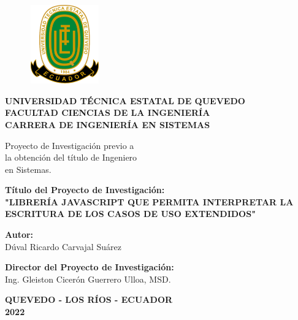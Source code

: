 \begin{center}
		\begin{figure}[htb]
		\begin{center}
			\includegraphics[width=3.04cm,height=3.39cm]{img/logoUTEQ.png}
		\end{center}
	\end{figure}
	{\caratuladc \textbf{UNIVERSIDAD TÉCNICA ESTATAL DE QUEVEDO}}\\
	\vspace*{0.2cm}
	{\titulosndc \textbf{FACULTAD CIENCIAS DE LA INGENIERÍA}}\\
	\vspace*{0.2cm}
	{\titulosndc \textbf{CARRERA DE INGENIERÍA EN SISTEMAS}}\\
	\vspace*{0.2in}
	
	\begin{flushright}
		Proyecto de Investigación previo a \\
		 la obtención del título de Ingeniero \\ en Sistemas. 
	\end{flushright}
	\vspace*{0.2in}
		
	\textbf{Título del Proyecto de Investigación:} \\
	\vspace*{0.3cm}
	\textbf{"LIBRERÍA JAVASCRIPT QUE PERMITA
		INTERPRETAR LA ESCRITURA DE LOS CASOS DE USO EXTENDIDOS"}
	\vspace*{0.3in}
	
	\textbf{Autor:} \\
	\vspace*{0.3cm}
	Dúval Ricardo Carvajal Suárez
	\vspace*{0.3in}
	
	\textbf{Director del Proyecto de Investigación:} \\
	\vspace*{0.3cm}
	Ing. Gleiston Cicerón Guerrero Ulloa, MSD.
	\vspace*{0.3in}
	
	\textbf{QUEVEDO - LOS RÍOS - ECUADOR} \\
	\textbf{2022}
	
\end{center}